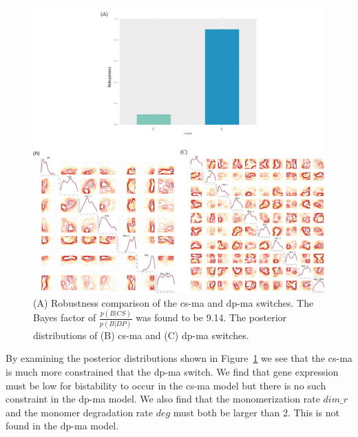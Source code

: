 \begin{figure}[htbp]
\centerfloat
\includegraphics[width=1.1\textwidth]{../../chapters/chapterStabilityFinder/images/MA_sym_post_w.png}
\caption[Robustness comparison of the \acrshort{cs-ma} and \acrshort{dp-ma} switches]{ \label{fig:ma-sym-det-post}(A) Robustness comparison of the \acrshort{cs-ma} and \acrshort{dp-ma} switches. The Bayes factor of $\frac{p(B|CS)}{p(B|DP)}$ was found to be 9.14. The posterior distributions of (B) \acrshort{cs-ma} and (C) \acrshort{dp-ma} switches. }
\end{figure}


By examining the posterior distributions shown in Figure~\ref{fig:ma-sym-det-post} we see that the \acrshort{cs-ma} is much more constrained that the \acrshort{dp-ma} switch. We find that gene expression must be low for bistability to occur in the \acrshort{cs-ma} model but there is no such constraint in the \acrshort{dp-ma} model. We also find that the monomerization rate $dim\_r$ and the monomer degradation rate $deg$ must both be larger than 2. This is not found in the \acrshort{dp-ma} model. 


